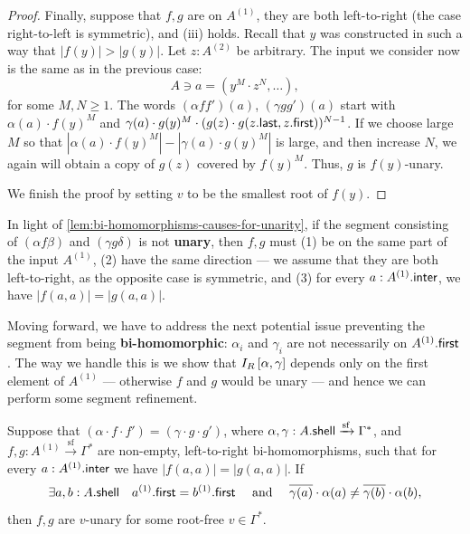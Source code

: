 \begin{proof}
    Finally, suppose that $f,g$ are on $A^{(1)}$, they are both left-to-right (the case right-to-left is symmetric), and (iii) holds. Recall that $y$ was constructed in such a way that $|f(y)| > |g(y)|$. Let $z : A^{(2)}$ be arbitrary. The input we consider now is the same as in the previous case:
    \[
        A \ni a = (y^M \cdot z^N, \dots),
    \]
    for some $M, N \geq 1$. The words $(\alpha f f')(a)$, $(\gamma g g')(a)$ start with $\alpha(a) \cdot f(y)^M$ and $\gamma(a) \cdot g(y)^M \cdot (g(z) \cdot g(z . \mathsf{last}, z . \mathsf{first}))^{N-1}$. If we choose large $M$ so that $|\alpha(a) \cdot f(y)^M| - |\gamma(a) \cdot g(y)^M|$ is large, and then increase $N$, we again will obtain a copy of $g(z)$ covered by $f(y)^M$. Thus, $g$ is $f(y)$-unary.

    We finish the proof by setting $v$ to be the smallest root of $f(y)$.
\end{proof}

In light of \cref{lem:bi-homomorphisms-causes-for-unarity}, if the segment consisting of $(\alpha f \beta)$ and $(\gamma g \delta)$ is not \textbf{unary}, then $f, g$ must (1) be on the same part of the input $A^{(1)}$, (2) have the same direction --- we assume that they are both left-to-right, as the opposite case is symmetric, and (3) for every $a : A^{(1)} . \mathsf{inter}$, we have $|f(a,a)| = |g(a,a)|$.

Moving forward, we have to address the next potential issue preventing the segment from being \textbf{bi-homomorphic}: $\alpha_i$ and $\gamma_i$ are not necessarily on $A^{(1)} . \mathsf{first}$. The way we handle this is we show that $I_R \left[ \alpha, \gamma \right]$ depends only on the first element of $A^{(1)}$ --- otherwise $f$ and $g$ would be unary --- and hence we can perform some segment refinement.

\begin{lemma}\label{lem:bi-homomorphisms-cause-for-unarity-by-prefix-interface}
    Suppose that $(\alpha \cdot f  \cdot f') = (\gamma \cdot g \cdot g')$, where $\alpha, \gamma : A . \mathsf{shell} \xrightarrow{\mathrm{sf}} \Gamma^*$, and $f,g : A^{(1)} \xrightarrow{\mathrm{sf}} \Gamma^*$ are non-empty, left-to-right bi-homomorphisms, such that for every $a : A^{(1)} . \mathsf{inter}$ we have $|f(a,a)| = |g(a,a)|$. If
    \[
        \exists a, b : A . \mathsf{shell} \quad a^{(1)} . \mathsf{first} = b^{(1)} . \mathsf{first} \quad \text{ and } \quad \overline{\gamma(a)} \cdot \alpha(a) \neq \overline{\gamma(b)} \cdot \alpha(b),
    \]
    then $f,g$ are $v$-unary for some root-free $v \in \Gamma^*$.
\end{lemma}

